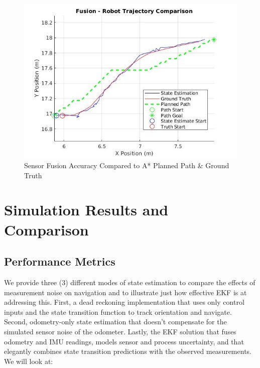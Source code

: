 \documentclass[
  letterpaper,
  DIV=11,
  numbers=noendperiod]{scrartcl}
\begin{document}
\begin{figure}

{\centering \includegraphics{fusion-accuracy.png}

}

\caption{\label{fig-fusion-accuracy}Sensor Fusion Accuracy Compared to
A* Planned Path \& Ground Truth}

\end{figure}

\hypertarget{simulation-results-and-comparison}{%
\section{Simulation Results and
Comparison}\label{simulation-results-and-comparison}}

\hypertarget{performance-metrics}{%
\subsection{Performance Metrics}\label{performance-metrics}}

We provide three (3) different modes of state estimation to compare the
effects of measurement noise on navigation and to illustrate just how
effective EKF is at addressing this. First, a dead reckoning
implementation that uses only control inputs and the state transition
function to track orientation and navigate. Second, odometry-only state
estimation that doesn't compensate for the simulated sensor noise of the
odometer. Lastly, the EKF solution that fuses odometry and IMU readings,
models sensor and process uncertainty, and that elegantly combines state
transition predictions with the observed measurements. We will look at:
\end{document}
